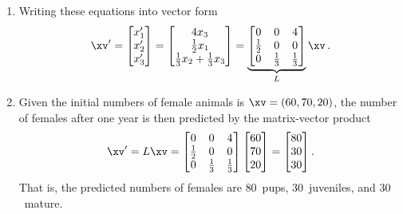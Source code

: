 \begin{example}
\begin{solution}
\begin{enumerate}
\item Writing these equations into vector form
\begin{equation*}
\xv'=\begin{bmatrix} x'_1\\x'_2\\x'_3 \end{bmatrix}
=\begin{bmatrix} 4x_3\\\frac12x_1\\\frac13x_2+\frac13x_3 \end{bmatrix}
=\underbrace{\begin{bmatrix} 0&0&4\\\frac12&0&0\\0&\frac13&\frac13 \end{bmatrix}}_L\xv\,.
\end{equation*}

\item Given the initial numbers of female animals is \(\xv=(60,70,20)\), the number of females after one year is then predicted by the matrix-vector product 
\begin{equation*}
\xv'=L\xv=\begin{bmatrix} 0&0&4\\\frac12&0&0\\0&\frac13&\frac13 \end{bmatrix}
\begin{bmatrix} 60\\70\\20 \end{bmatrix}
=\begin{bmatrix} 80\\30\\30 \end{bmatrix}.
\end{equation*}
That is, the predicted numbers of females are \(80\)~pups, \(30\)~juveniles, and \(30\)~mature.


\end{enumerate}
\end{solution}
\end{example}
